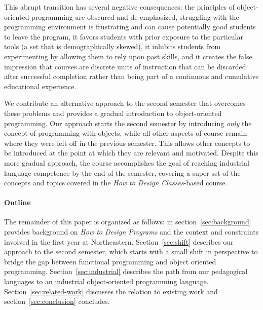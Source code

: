\documentclass[submission,copyright]{eptcs}
\begin{document}
This abrupt transition has several negative consequences: the
principles of object-oriented programming are obscured and
de-emphasized, struggling with the programming environment is
frustrating and can cause potentially good students to leave the
program, it favors students with prior exposure to the particular
tools (a set that is demographically skewed), it inhibits students
from experimenting by allowing them to rely upon past skills, and it creates
the false impression that courses are discrete units of instruction
that can be discarded after successful completion rather than being
part of a continuous and cumulative educational experience.


We contribute an alternative approach to the second semester that
overcomes these problems and provides a gradual introduction 
to object-oriented programming.  Our approach
starts the second semester by introducing \emph{only} the
concept of programming with objects, while all other aspects of course
remain where they were left off in the previous semester.  This
 allows other concepts to be introduced at the point at
which they are relevant and motivated.  Despite this more gradual
approach, the course accomplishes the goal of reaching industrial
language competence by the end of the semester, covering a super-set
of the concepts and topics covered in the \emph{How to Design Classes}-based
course.

\paragraph{Outline} The remainder of this paper is organized as follows:
in section~\ref{sec:background} provides background on \emph{How to
  Design Programs} and the context and constraints involved in the
first year at Northeastern.  Section~\ref{sec:shift} describes our
approach to the second semester, which starts with a small shift in
perspective to bridge the gap between functional programming and
object oriented programming.  Section~\ref{sec:industrial} describes
the path from our pedagogical languages to an industrial object-oriented
programming language.  Section~\ref{sec:related-work} discusses the
relation to existing work and section~\ref{sec:conclusion} concludes.


\end{document}
